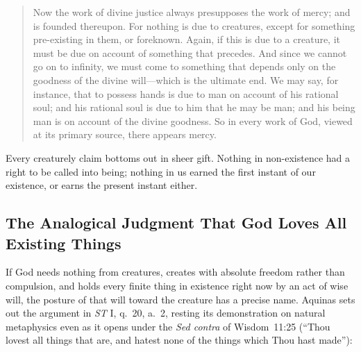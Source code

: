 \begin{quote}
Now the work of divine justice always presupposes the work of mercy; and is founded thereupon. For nothing is due to creatures, except for something pre-existing in them, or foreknown. Again, if this is due to a creature, it must be due on account of something that precedes. And since we cannot go on to infinity, we must come to something that depends only on the goodness of the divine will---which is the ultimate end. We may say, for instance, that to possess hands is due to man on account of his rational soul; and his rational soul is due to him that he may be man; and his being man is on account of the divine goodness. So in every work of God, viewed at its primary source, there appears mercy.
\end{quote}

Every creaturely claim bottoms out in sheer gift. Nothing in non-existence had a right to be called into being; nothing in us earned the first instant of our existence, or earns the present instant either.

\subsection{The Analogical Judgment That God Loves All Existing Things}

If God needs nothing from creatures, creates with absolute freedom rather than compulsion, and holds every finite thing in existence right now by an act of wise will, the posture of that will toward the creature has a precise name. Aquinas sets out the argument in \emph{ST} I, q.\ 20, a.\ 2, resting its demonstration on natural metaphysics even as it opens under the \emph{Sed contra} of Wisdom~11:25 (``Thou lovest all things that are, and hatest none of the things which Thou hast made''):

